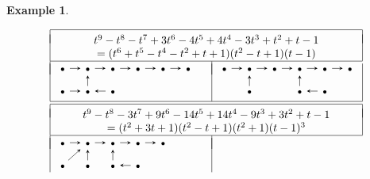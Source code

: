 \documentclass[11pt, letterpaper]{amsart}
\theoremstyle{definition}
\newtheorem{example}[theorem]{Example}
\numberwithin{equation}{section}
\begin{document}
\begin{example}
\begin{figure}[ht]
\begin{equation*}
\begin{array}{|l|l|} 
\hline
\multicolumn{2}{|c|}{}\\[-8pt]
\multicolumn{2}{|c|}{t^9 - t^8 - t^7 + 3t^6 - 4t^5 + 4t^4 - 3t^3 + t^2 + t - 1}\\
\multicolumn{2}{|c|}{= (t^6 + t^5 - t^4 - t^2 + t + 1)(t^2 - t + 1)(t - 1)}\\
\hline
\ \\[-10pt]
\begin{tikzcd}[arrows={-stealth}, sep=1em]
  \scriptstyle\bullet  \arrow[r]   & \scriptstyle\bullet  \arrow[r] & \scriptstyle\bullet \arrow[r] & \scriptstyle\bullet \arrow[r] & \scriptstyle\bullet \arrow[r] & \scriptstyle\bullet \\
 \scriptstyle\bullet  \arrow[r] & \scriptstyle\bullet  \arrow[u] &  \scriptstyle\bullet \arrow[l]
   & & &
\end{tikzcd}
\quad & 
\begin{tikzcd}[arrows={-stealth}, sep=1em]
  \scriptstyle\bullet  \arrow[r]   & \scriptstyle\bullet  \arrow[r] & \scriptstyle\bullet \arrow[r] & \scriptstyle\bullet \arrow[r] & \scriptstyle\bullet \arrow[r] & \scriptstyle\bullet \\
 & \scriptstyle\bullet  \arrow[u] &  & \scriptstyle\bullet \arrow[u] & \scriptstyle\bullet \arrow[l] & 
\end{tikzcd}
\\[15pt] 
\hline
\multicolumn{2}{c}{}\\[-10pt]
\hline
\multicolumn{2}{|c|}{}\\[-8pt]
\multicolumn{2}{|c|}{t^9 - t^8 - 3t^7 + 9t^6 - 14t^5 + 14t^4 - 9t^3 + 3t^2 + t - 1}\\
\multicolumn{2}{|c|}{= (t^2 + 3t + 1)(t^2 - t + 1)(t^2 + 1)(t - 1)^3}\\
\hline
\ \\[-10pt]
\begin{tikzcd}[arrows={-stealth}, sep=1em]
  \scriptstyle\bullet  \arrow[r]   & \scriptstyle\bullet  \arrow[r] & \scriptstyle\bullet \arrow[r] & \scriptstyle\bullet \arrow[r] & \scriptstyle\bullet \\
 \scriptstyle\bullet  \arrow[ur] & \scriptstyle\bullet  \arrow[u] &  \scriptstyle\bullet \arrow[u] &  \scriptstyle\bullet \arrow[l] & 
\end{tikzcd}

\end{array}
\end{equation*}
\end{figure}
\end{example}
\end{document}
